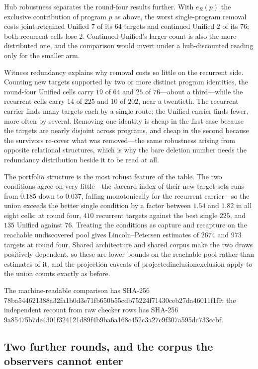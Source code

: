 \documentclass[11pt]{article}
\newcommand{\leanname}[1]{{\scriptsize\ttfamily
  \def\_{\textunderscore\allowbreak}#1}}
\begin{document}
Hub robustness separates the round-four results further. With $e_R(p)$ the exclusive
contribution of program $p$ as above, the worst single-program removal costs joint-retrained
Unified $7$ of its $64$ targets and continued Unified $2$ of its $76$; both recurrent cells
lose $2$. Continued Unified's larger count is also the more distributed one, and the
comparison would invert under a hub-discounted reading only for the smaller arm.

Witness redundancy explains why removal costs so little on the recurrent side. Counting new
targets supported by two or more distinct program identities, the round-four Unified cells
carry $19$ of $64$ and $25$ of $76$---about a third---while the recurrent cells carry $14$ of
$225$ and $10$ of $202$, near a twentieth. The recurrent carrier finds many targets each by a
single route; the Unified carrier finds fewer, more often by several. Removing one identity is
cheap in the first case because the targets are nearly disjoint across programs, and cheap in
the second because the survivors re-cover what was removed---the same robustness arising from
opposite relational structures, which is why the bare deletion number needs the redundancy
distribution beside it to be read at all.

The portfolio structure is the most robust feature of the table. The two conditions agree on
very little---the Jaccard index of their new-target sets runs from $0.185$ down to $0.037$,
falling monotonically for the recurrent carrier---so the union exceeds the better single
condition by a factor between $1.54$ and $1.82$ in all eight cells: at round four, $410$
recurrent targets against the best single $225$, and $135$ Unified against $76$. Treating the
conditions as capture and recapture on the reachable undiscovered pool gives Lincoln--Petersen
estimates of $2674$ and $973$ targets at round four. Shared architecture and shared corpus make
the two draws positively dependent, so these are lower bounds on the reachable pool rather than
estimates of it, and the projection caveats of
\leanname{projected\_inclusion\_exclusion} apply to the union counts exactly as before.

The machine-readable comparison has SHA-256
{\scriptsize\ttfamily
78ba544621388a32fa1b0d3e71fb650b55cdb75224f71430ceb27da46011f1f9};
the independent recount from raw checker rows has SHA-256
{\scriptsize\ttfamily
9a85475b7de4301f324121d89f4b9ba6a168c452c3a27c9f307a595dc733ccbf}.

\subsection{Two further rounds, and the corpus the observers cannot enter}
\label{sec:later-rounds}
\end{document}
